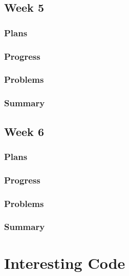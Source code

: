 \documentclass[onecolumn, draftclsnofoot,10pt, compsoc]{article}
\begin{document}
		\subsection{Week 5}
			\subsubsection{Plans}
			
			\subsubsection{Progress}
			
			\subsubsection{Problems}
			
			\subsubsection{Summary}
			
		\subsection{Week 6}
			\subsubsection{Plans}
			
			\subsubsection{Progress}
			
			\subsubsection{Problems}
			
			\subsubsection{Summary}
			
\section{Interesting Code}
\end{document}
